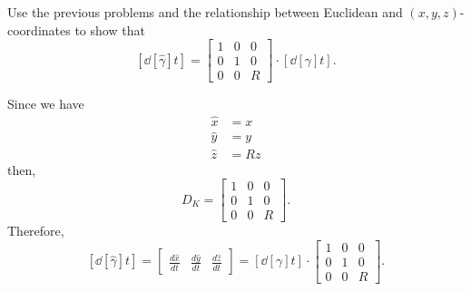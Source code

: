 \documentclass[newpage,hints,handout]{ximera}
\begin{document}
\begin{problem}
  Use the previous problems and the relationship between Euclidean and
  $(x,y,z)$-coordinates to show that
  \[
  \left[\dd[\hat{\gamma}]{t}\right] =
  \begin{bmatrix}
    1 & 0 & 0\\
    0 & 1 & 0\\
    0 & 0 & R
  \end{bmatrix}\cdot \left[ \dd[\gamma]{t}\right].
  \]
  
\begin{freeResponse}
Since we have 
\begin{align*}
\hat{x}  &  =x\\
\hat{y}  &  =y\\
\hat{z}  &  =Rz
\end{align*}
then, 
\[
D_K = 
 \begin{bmatrix}
    1 & 0 & 0\\
    0 & 1 & 0\\
    0 & 0 & R
  \end{bmatrix}.
  \]
  Therefore, 
  \[
 \left[\dd[\hat{\gamma}]{t}\right] 
= \begin{bmatrix}
\frac{d\hat{x}}{dt} & \frac{d\hat{y}}{dt} & \frac{d\hat{z}}{dt}%
\end{bmatrix}
= \left[ \dd[\gamma]{t}\right] \cdot
  \begin{bmatrix}
    1 & 0 & 0\\
    0 & 1 & 0\\
    0 & 0 & R
  \end{bmatrix}.
\]
\end{freeResponse}

\end{problem}
\end{document}

